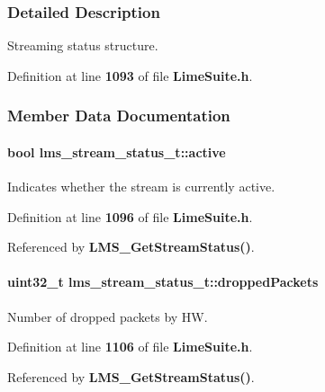 \subsubsection{Detailed Description}
Streaming status structure. 

Definition at line {\bf 1093} of file {\bf Lime\+Suite.\+h}.



\subsubsection{Member Data Documentation}
\paragraph[{active}]{\setlength{\rightskip}{0pt plus 5cm}bool lms\+\_\+stream\+\_\+status\+\_\+t\+::active}\label{structlms__stream__status__t_a42baa4618667eafdbf01d815c00b0cb1}


Indicates whether the stream is currently active. 



Definition at line {\bf 1096} of file {\bf Lime\+Suite.\+h}.



Referenced by {\bf L\+M\+S\+\_\+\+Get\+Stream\+Status()}.

\paragraph[{dropped\+Packets}]{\setlength{\rightskip}{0pt plus 5cm}uint32\+\_\+t lms\+\_\+stream\+\_\+status\+\_\+t\+::dropped\+Packets}\label{structlms__stream__status__t_a7a750eb3a12a3125066229ccd42e8149}


Number of dropped packets by HW. 



Definition at line {\bf 1106} of file {\bf Lime\+Suite.\+h}.



Referenced by {\bf L\+M\+S\+\_\+\+Get\+Stream\+Status()}.

